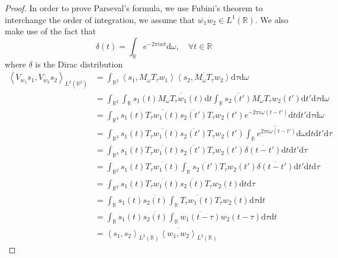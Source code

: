 \documentclass[
  american,
]{article}
\begin{document}
\begin{proof}
In order to prove Parseval's formula, we use Fubini's theorem
to interchange the order of integration, we assume that \(\overline{w_1}w_2\in L^1(\mathbb{R})\).
We also make use of the fact that
\begin{equation}
\delta(t)=\int_\mathbb{R}e^{-2\pi iwt}\mathrm{d}\omega,\quad\forall t\in\mathbb{R}
\end{equation}
where \(\delta\) is the Dirac distribution
\begin{align}
\left\langle V_{w_1}s_1,V_{w_2}s_2\right\rangle_{L^2(\mathbb{R}^2)}
&= \int_{\mathbb{R}^2} \left\langle s_1,M_\omega T_\tau w_1\right\rangle \overline{\left\langle s_2,M_\omega T_\tau w_2\right\rangle} \mathrm{d}\tau\mathrm{d}\omega\\
&= \int_{\mathbb{R}^2} \int_\mathbb{R}s_1(t)\overline{M_\omega T_\tau w_1(t)}\mathrm{d}t
               \int_\mathbb{R}\overline{s_2(t')} M_\omega T_\tau w_2(t') \mathrm{d}t' \mathrm{d}\tau\mathrm{d}\omega\\
&= \int_{\mathbb{R}^4} s_1(t)\overline{T_\tau w_1(t)}
    \overline{s_2(t')} T_\tau w_2(t') e^{-2\pi i\omega(t-t')} \mathrm{d}t\mathrm{d}t'\mathrm{d}\tau\mathrm{d}\omega\\
&= \int_{\mathbb{R}^3} s_1(t)\overline{T_\tau w_1(t)} \overline{s_2(t')} T_\tau w_2(t')
    \overline{\int_\mathbb{R}e^{2\pi i\omega(t-t')}\mathrm{d}\omega} \mathrm{d}t\mathrm{d}t'\mathrm{d}\tau\\
&= \int_{\mathbb{R}^3} s_1(t)\overline{T_\tau w_1(t)} \overline{s_2(t')} T_\tau w_2(t')
    \overline{\delta(t-t')} \mathrm{d}t\mathrm{d}t'\mathrm{d}\tau\\
&= \int_{\mathbb{R}^2} s_1(t)\overline{T_\tau w_1(t)}
    \int_\mathbb{R}\overline{s_2(t')} T_\tau w_2(t') \overline{\delta(t-t')}\mathrm{d}t'\mathrm{d}t\mathrm{d}\tau\\
&= \int_{\mathbb{R}^2} s_1(t)\overline{T_\tau w_1(t)} \overline{s_2(t)} T_\tau w_2(t)\mathrm{d}t\mathrm{d}\tau\\
&= \int_\mathbb{R}s_1(t)\overline{s_2(t)} \int_\mathbb{R}\overline{T_\tau w_1(t)} T_\tau w_2(t)\mathrm{d}\tau\mathrm{d}t\\
&= \int_\mathbb{R}s_1(t)\overline{s_2(t)} \int_\mathbb{R}\overline{w_1(t-\tau)} w_2(t-\tau)\mathrm{d}\tau\mathrm{d}t\\
&= \left\langle s_1,s_2\right\rangle_{L^2(\mathbb{R})} \overline{\left\langle w_1,w_2\right\rangle}_{L^2(\mathbb{R})}
\end{align}
\end{proof}
\end{document}

